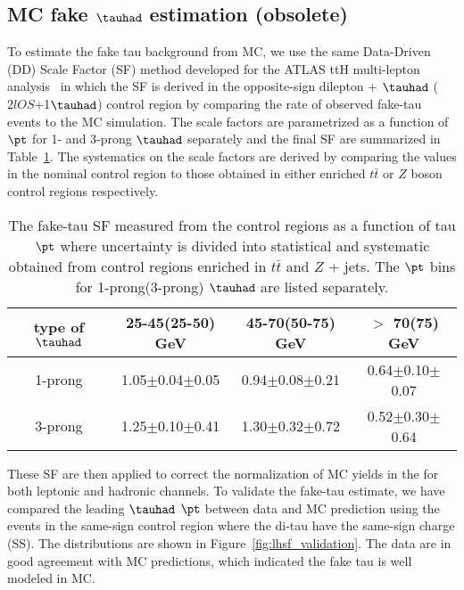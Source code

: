 \subsection{MC fake $\tauhad$ estimation (obsolete)}
\label{sec:sf_method_obsolete}

To estimate the fake tau background from MC, we use the same Data-Driven (DD) Scale Factor (SF) method developed for the ATLAS 
ttH multi-lepton analysis~\cite{ATL-COM-PHYS-2018-410} 
in which the SF is derived in the opposite-sign dilepton + $\tauhad$ ($2lOS$+1$\tauhad$) control region by comparing the rate of observed fake-tau events to 
the MC simulation. The scale factors are parametrized as a function of $\pt$ for 1- and 3-prong $\tauhad$ separately and the final 
SF are summarized in Table~\ref{tab:faketauSF}. The systematics on the scale factors are derived by comparing the values in the nominal control region to
those obtained in either enriched $t\bar t$ or $Z$ boson control regions respectively.

\begin{table}[htb]
\caption{ The fake-tau SF measured from the control regions as a function of tau $\pt$ where uncertainty is divided into statistical and 
systematic obtained from control regions enriched in $t\bar t$ and $Z$ + jets. The $\pt$ bins for 1-prong(3-prong) $\tauhad$ are listed separately.}
\centering
\begin{tabular}{|c|c|c|c|} \hline
type of $\tauhad$  & 25-45(25-50) GeV & 45-70(50-75) GeV  & $>$ 70(75) GeV \\ \hline
1-prong & 1.05$\pm$0.04$\pm$0.05 & 0.94$\pm$0.08$\pm$0.21 & 0.64$\pm$0.10$\pm$0.07 \\
3-prong & 1.25$\pm$0.10$\pm$0.41 & 1.30$\pm$0.32$\pm$0.72 & 0.52$\pm$0.30$\pm$0.64 \\ \hline
\end{tabular}
\label{tab:faketauSF}
\end{table}

These SF are then applied to correct the normalization of MC yields in the for both leptonic and hadronic channels. 
To validate the fake-tau estimate, we have compared the leading $\tauhad$ $\pt$ between data and MC prediction using the events in 
the same-sign control region where the di-tau have the same-sign charge (SS).
The distributions are shown in Figure~\ref{fig:lhsf_validation}. The data are in good agreement with MC predictions, 
which indicated the fake tau is well modeled in MC. 
